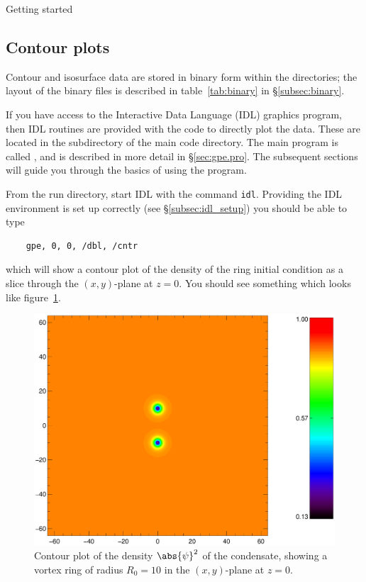 \begin{chapter}{\label{cha:quickstart}Getting started}
  \subsection{\label{subsec:contour_plots}Contour plots}
  Contour and isosurface data are stored in binary form within the
   directories; the layout of the binary files is described in
  table~\ref{tab:binary} in \S\ref{subsec:binary}.

  If you have access to the Interactive Data Language (IDL) graphics program,
  then IDL routines are provided with the code to directly plot the data.
  These are located in the  subdirectory of the main code
  directory.  The main program is called , and is described in
  more detail in \S\ref{sec:gpe.pro}.  The subsequent sections will guide you
  through the basics of using the program.

  From the run directory, start IDL with the command \verb"idl".  Providing the
  IDL environment is set up correctly (see \S\ref{subsec:idl_setup}) you
  should be able to type
  \begin{Verbatim}
    gpe, 0, 0, /dbl, /cntr
  \end{Verbatim}
  which will show a contour plot of the density of the ring initial condition
  as a slice through the $(x,y)$-plane at $z=0$.  You should see something
  which looks like figure~\ref{fig:ring_ic_con}.
  \begin{figure}[h]
    \centering
    \includegraphics[scale=0.5]{fig/ring_ic_con}
    \caption{\label{fig:ring_ic_con}Contour plot of the density
      $\abs{\psi}^{2}$ of the condensate, showing a vortex ring of radius
      $R_{0}=10$ in the $(x,y)$-plane at $z=0$.}
  \end{figure}
  

\end{chapter}
